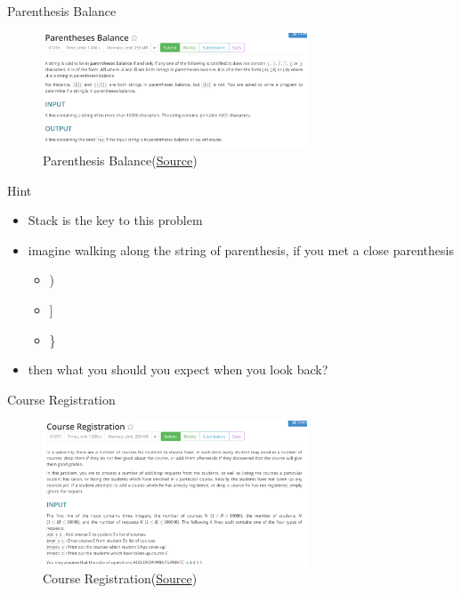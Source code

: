 \documentclass[10pt,xcolor={table,dvipsnames},t]{beamer}
\begin{document}
\begin{frame}{Parenthesis Balance}
  \begin{figure}[h!]
    \includegraphics[width=0.7\textwidth]{Q2.png}
    \caption{Parenthesis Balance(\href{https://judge.hkoi.org/task/01015}{Source})}
  \end{figure}
\end{frame}

\begin{frame}{Hint}
  \begin{itemize}
    \item Stack is the key to this problem
    \item imagine walking along the string of parenthesis, if you met a close parenthesis
    \begin{itemize}
      \item )
      \item ]
      \item \}
    \end{itemize}
    \item then what you should you expect when you look back?
  \end{itemize}
\end{frame}

\begin{frame}{Course Registration}
  \begin{figure}[h!]
    \includegraphics[width=0.7\textwidth]{Q3.png}
    \caption{Course Registration(\href{https://judge.hkoi.org/task/01077}{Source})}
  \end{figure}
\end{frame}
\end{document}

